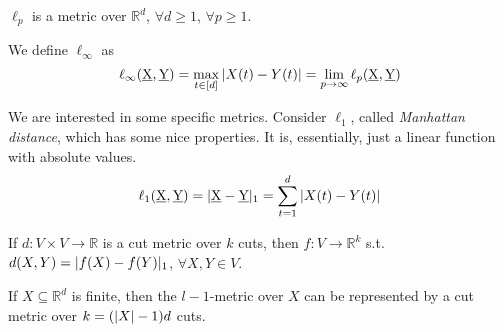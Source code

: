     \begin{theorem}
        $\ell_p$ is a metric over $\mathbb{R}^d$, $\forall d \geq 1$, $\forall p \geq 1$.
    \end{theorem}

    We define $\ell_\infty$ as
    \[ \ell_\infty(\underbar{X}, \underbar{Y}) = \max_{t \in [d]} \vert X(t) - Y(t) \vert = \lim_{p \rightarrow \infty} \ell_p(\underbar{X}, \underbar{Y}) \]

    We are interested in some specific metrics.
    Consider $\ell_1$, called \textit{Manhattan distance}, which has some nice properties.
    It is, essentially, just a linear function with absolute values.
    \[ \ell_1(\underbar{X}, \underbar{Y}) = \vert \underbar{X} - \underbar{Y} \vert_1 = \sum_{t=1}^{d} \vert X(t) - Y(t) \vert \]

    \begin{lemma}\label{lemma:metric4}
        If $d : V \times V \rightarrow \mathbb{R}$ is a cut metric over $k$ cuts, then $f : V \rightarrow \mathbb{R}^k$ s.t. $d(X,Y) = \vert f(X) - f(Y) \vert_1$, $\forall X,Y \in V$.

        If $X \subseteq \mathbb{R}^d$ is finite, then the $l-1$-metric over $X$ can be represented by a cut metric over $k = (\vert X \vert-1)d$ cuts.
    \end{lemma}

